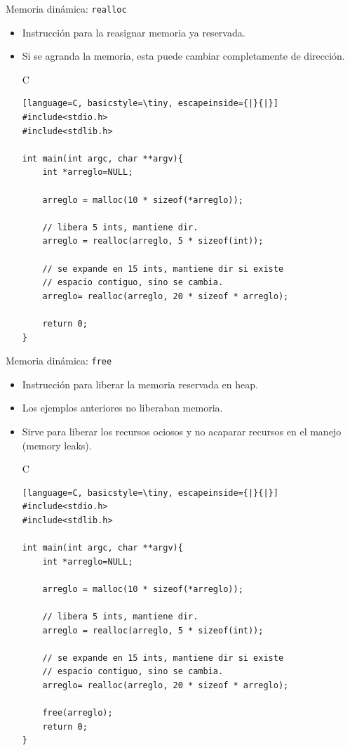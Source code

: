 \documentclass{beamer}
\begin{document}
\begin{frame}[fragile]{Memoria dinámica: \texttt{realloc}}
\begin{itemize}
\item Instrucción para la reasignar memoria ya reservada.
\item Si se agranda la memoria, esta puede cambiar completamente de dirección.
\begin{exampleblock}{C}
\begin{lstlisting}[language=C, basicstyle=\tiny, escapeinside={|}{|}]
#include<stdio.h>
#include<stdlib.h>

int main(int argc, char **argv){
	int *arreglo=NULL;

	arreglo = malloc(10 * sizeof(*arreglo));

	// libera 5 ints, mantiene dir.
	arreglo = realloc(arreglo, 5 * sizeof(int));

	// se expande en 15 ints, mantiene dir si existe
	// espacio contiguo, sino se cambia.
	arreglo= realloc(arreglo, 20 * sizeof * arreglo);

	return 0;
}
\end{lstlisting}
\end{exampleblock}
\end{itemize}
\end{frame}

\begin{frame}[fragile]{Memoria dinámica: \texttt{free}}
\begin{itemize}
\item Instrucción para liberar la memoria reservada en heap.
\item Los ejemplos anteriores no liberaban memoria.
\item Sirve para liberar los recursos ociosos y no acaparar recursos en el manejo (memory leaks).

\begin{exampleblock}{C}
\begin{lstlisting}[language=C, basicstyle=\tiny, escapeinside={|}{|}]
#include<stdio.h>
#include<stdlib.h>

int main(int argc, char **argv){
	int *arreglo=NULL;

	arreglo = malloc(10 * sizeof(*arreglo));

	// libera 5 ints, mantiene dir.
	arreglo = realloc(arreglo, 5 * sizeof(int));

	// se expande en 15 ints, mantiene dir si existe
	// espacio contiguo, sino se cambia.
	arreglo= realloc(arreglo, 20 * sizeof * arreglo);

	free(arreglo);
	return 0;
}
\end{lstlisting}
\end{exampleblock}
\end{itemize}
\end{frame}
\end{document}

